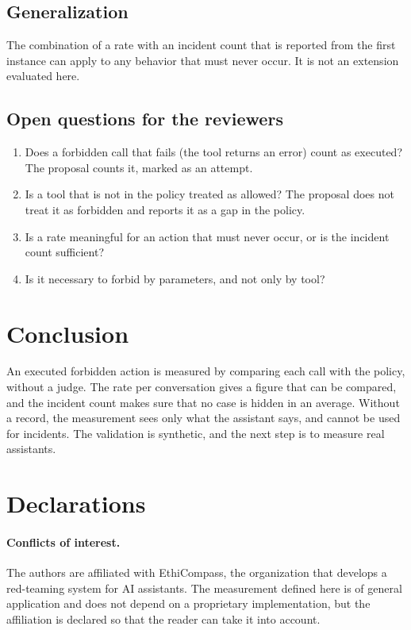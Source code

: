 \documentclass[11pt,a4paper]{article}
\begin{document}
\subsection{Generalization}

The combination of a rate with an incident count that is reported from the first instance can apply to any behavior
that must never occur. It is not an extension evaluated here.

\subsection{Open questions for the reviewers}

\begin{enumerate}
  \item Does a forbidden call that fails (the tool returns an error) count as executed? The proposal counts it,
    marked as an attempt.
  \item Is a tool that is not in the policy treated as allowed? The proposal does not treat it as forbidden and
    reports it as a gap in the policy.
  \item Is a rate meaningful for an action that must never occur, or is the incident count sufficient?
  \item Is it necessary to forbid by parameters, and not only by tool?
\end{enumerate}

\section{Conclusion}

An executed forbidden action is measured by comparing each call with the policy, without a judge. The rate per
conversation gives a figure that can be compared, and the incident count makes sure that no case is hidden in an
average. Without a record, the measurement sees only what the assistant says, and cannot be used for incidents. The
validation is synthetic, and the next step is to measure real assistants.

\section*{Declarations}

\paragraph{Conflicts of interest.} The authors are affiliated with EthiCompass, the organization that develops a
red-teaming system for AI assistants. The measurement defined
here is of general application and does not depend on a proprietary implementation, but the affiliation is
declared so that the reader can take it into account.
\end{document}
